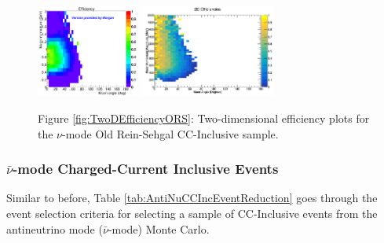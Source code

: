 \documentclass[11pt]{article}
\begin{document}
\begin{figure}[H]
\centering
\includegraphics[width=0.3\textwidth]{CCInclusivePlots/MorgansCCInclusiveSample.png}
\includegraphics[width=0.4\textwidth]{CCInclusivePlots/2DEffCompareNMORS.png}
\caption*{Figure \ref*{fig:TwoDEfficiencyORS}: Two-dimensional efficiency plots for the $\nu$-mode Old Rein-Sehgal CC-Inclusive sample.}
\end{figure}\label{fig:TwoDEfficiencyORS}

\subsubsection{$\bar{\nu}$-mode Charged-Current Inclusive Events}\label{sub:antiNuModeCCInclusive}

Similar to before, Table \ref*{tab:AntiNuCCIncEventReduction} goes through the event selection criteria for selecting a sample of CC-Inclusive events from the antineutrino mode ($\bar{\nu}$-mode) Monte Carlo.
\end{document}
